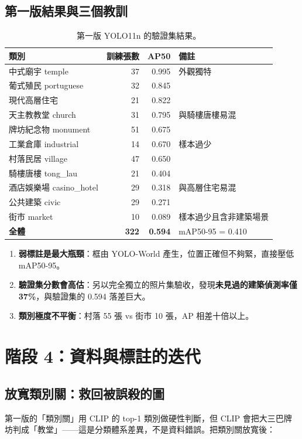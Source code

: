 \documentclass[11pt,a4paper,fontset=windows]{ctexart}
\begin{document}
\subsection{第一版結果與三個教訓}
\begin{table}[H]
\centering\small
\begin{tabular}{@{}lrrl@{}}
\toprule
\textbf{類別} & \textbf{訓練張數} & \textbf{AP50} & \textbf{備註} \\
\midrule
中式廟宇 temple & 37 & 0.995 & 外觀獨特 \\
葡式殖民 portuguese & 32 & 0.845 & \\
現代高層住宅 & 21 & 0.822 & \\
天主教教堂 church & 31 & 0.795 & 與騎樓唐樓易混 \\
牌坊紀念物 monument & 51 & 0.675 & \\
工業倉庫 industrial & 14 & 0.670 & 樣本過少 \\
村落民居 village & 47 & 0.650 & \\
騎樓唐樓 tong\_lau & 21 & 0.404 & \\
酒店娛樂場 casino\_hotel & 29 & 0.318 & 與高層住宅易混 \\
公共建築 civic & 29 & 0.271 & \\
街市 market & 10 & 0.089 & 樣本過少且含非建築場景 \\
\midrule
\textbf{全體} & \textbf{322} & \textbf{0.594} & mAP50-95 = 0.410 \\
\bottomrule
\end{tabular}
\caption{第一版 YOLO11n 的驗證集結果。}
\end{table}

\begin{enumerate}[leftmargin=1.4em,itemsep=2pt]
  \item \textbf{弱標註是最大瓶頸}：框由 YOLO-World 產生，位置正確但不夠緊，直接壓低 mAP50-95。
  \item \textbf{驗證集分數會高估}：另以完全獨立的照片集驗收，發現\textbf{未見過的建築偵測率僅 37\%}，與驗證集的 0.594 落差巨大。
  \item \textbf{類別極度不平衡}：村落 55 張 vs 街市 10 張，AP 相差十倍以上。
\end{enumerate}

\section{階段 4：資料與標註的迭代}

\subsection{放寬類別關：救回被誤殺的圖}
第一版的「類別關」用 CLIP 的 top-1 類別做硬性判斷，但 CLIP 會把大三巴牌坊判成「教堂」——這是分類體系差異，不是資料錯誤。把類別關放寬後：
\end{document}
